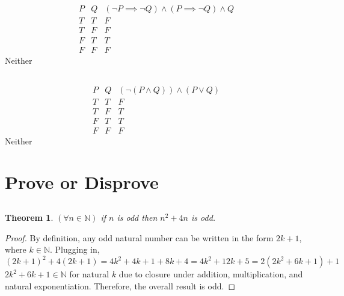 \documentclass{article}
\newtheorem{theorem}{Theorem}
\newcommand{\N}{\mathbb{N}}
\begin{document}
\subsection{}

\begin{equation}
    \begin{array}{c|c|c}
        P & Q & (\lnot P \implies \lnot Q) \land (P \implies \lnot Q) \land Q \\
        \hline
        T & T & F \\
        T & F & F \\
        F & T & T \\
        F & F & F
    \end{array}
\end{equation}
Neither

\subsection{}

\begin{equation}
    \begin{array}{c|c|c}
        P & Q & (\lnot (P \land Q)) \land (P \lor Q) \\
        \hline
        T & T & F \\
        T & F & T \\
        F & T & T \\
        F & F & F
    \end{array}
\end{equation}
Neither

\section{Prove or Disprove}

\subsection{}

\begin{theorem}
    \((\forall n \in \N)\) if \(n\) is odd then \(n^2 + 4n\) is odd.
\end{theorem}
\begin{proof}
    By definition, any odd natural number can be written in the form \(2k + 1\), where \(k \in \N\).
    Plugging in,
    \begin{equation}
        (2k + 1)^2 + 4(2k + 1) = 4k^2 + 4k + 1 + 8k + 4 = 4k^2 + 12k + 5 = 2(2k^2 + 6k + 1) + 1
    \end{equation}
    \(2k^2 + 6k + 1 \in \N\) for natural \(k\) due to closure under addition, multiplication, and natural exponentiation.
    Therefore, the overall result is odd.
\end{proof}
\end{document}
